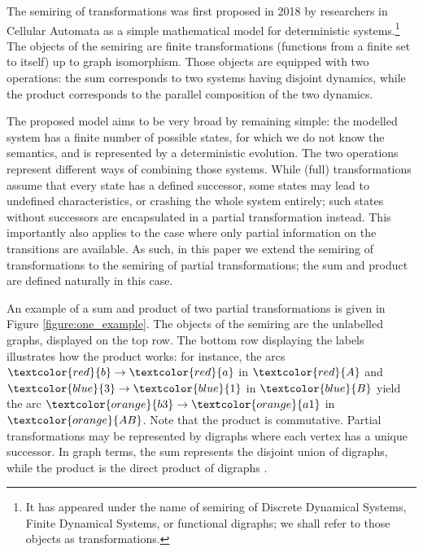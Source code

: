 \documentclass[a4paper, 11pt]{article}
\theoremstyle{plain}
\theoremstyle{definition}
\begin{document}
The semiring of transformations was first proposed in 2018 by researchers in Cellular Automata \cite{DDFMP18} as a simple mathematical model for deterministic systems.\footnote{It has appeared under the name of semiring of Discrete Dynamical Systems, Finite Dynamical Systems, or functional digraphs; we shall refer to those objects as transformations.} The objects of the semiring are finite transformations (functions from a finite set to itself) up to graph isomorphism. Those objects are equipped with two operations: the sum corresponds to two systems having disjoint dynamics, while the product corresponds to the parallel composition of the two dynamics. 


The proposed model aims to be very broad by remaining simple: the modelled system has a finite number of possible states, for which we do not know the semantics, and is represented by a deterministic evolution. The two operations represent different ways of combining those systems. While (full) transformations assume that every state has a defined successor, some states may lead to undefined characteristics, or crashing the whole system entirely; such states without successors are encapsulated in a partial transformation instead. This importantly also applies to the case where only partial information on the transitions are available. As such, in this paper we extend the semiring of transformations to the semiring of partial transformations; the sum and product are defined naturally in this case.


An example of a sum and product of two partial transformations is given in Figure \ref{figure:one_example}.  The objects of the semiring are the unlabelled graphs, displayed on the top row. The bottom row displaying the labels illustrates how the product works: for instance, the arcs $\textcolor{red}{b} \to \textcolor{red}{a}$ in $\textcolor{red}{A}$ and $\textcolor{blue}{3} \to \textcolor{blue}{1}$ in $\textcolor{blue}{B}$ yield the arc $\textcolor{orange}{b3} \to \textcolor{orange}{a1}$ in $\textcolor{orange}{AB}$. Note that the product is commutative. Partial transformations may be represented by digraphs where each vertex has a unique successor. In graph terms, the sum represents the disjoint union of digraphs, while the product is the direct product of digraphs \cite{HIK11}.
\end{document}
